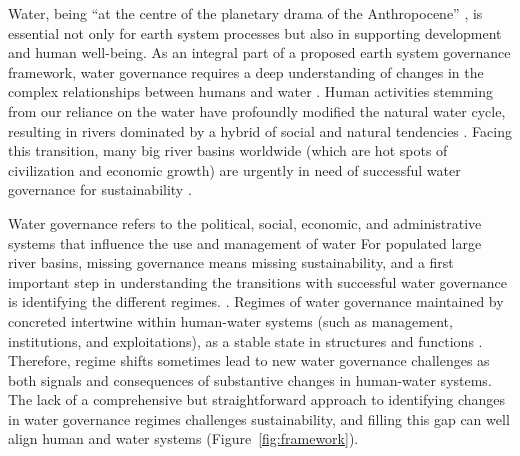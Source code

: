 \label{Intro.}
Water, being ``at the centre of the planetary drama of the Anthropocene'' \cite{gleesonIlluminatingwatercycle2020}, is essential not only for earth system processes but also in supporting development and human well-being.
As an integral part of a proposed earth system governance framework, water governance requires a deep understanding of changes in the complex relationships between humans and water
\cite{dibaldassarreSociohydrologyScientificChallenges2019,biermannNavigatingAnthropoceneImproving2012,steffenemergenceevolutionEarth2020}.
Human activities stemming from our reliance on the water have profoundly modified the natural water cycle, resulting in rivers dominated by a hybrid of social and natural tendencies
\cite{gleesonIlluminatingwatercycle2020,sivapalanSociohydrologynewscience2012,qinTheoreticalframeworkdualistic2014,abbottwatercycleAnthropocene2019,leviaHomogenizationterrestrialwater2020}.
Facing this transition, many big river basins worldwide (which are hot spots of civilization and economic growth) are urgently in need of successful water governance for sustainability
\cite{bestAnthropogenicstressesworld2019,falkenmarkUnderstandingwaterresilience2019,dibaldassarreSociohydrologyScientificChallenges2019}.

Water governance refers to the political, social, economic, and administrative systems that influence the use and management of water %
For populated large river basins, missing governance means missing sustainability, and a first important step in understanding the transitions with successful water governance is identifying the different regimes.
\cite{undpwatergovernancefacilityWaterGovernanceIssue}.
Regimes of water governance maintained by concreted intertwine within human-water systems (such as management, institutions, and exploitations), as a stable state in structures and functions
\cite{carpenterEarlyWarningsRegime2011,rochaCascadingregimeshifts2018, gregrCascadingsocialecologicalcosts2020}.
Therefore, regime shifts sometimes lead to new water governance challenges as both signals and consequences of substantive changes in human-water systems.
The lack of a comprehensive but straightforward approach to identifying changes in water governance regimes challenges sustainability, and filling this gap can well align human and water systems (Figure~\ref{fig:framework}).


